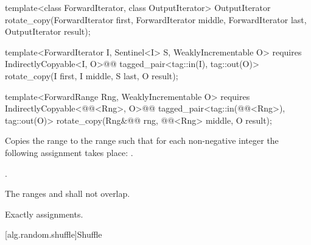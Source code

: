 %
\begin{removedblock}
\begin{itemdecl}
template<class ForwardIterator, class OutputIterator>
  OutputIterator
    rotate_copy(ForwardIterator first, ForwardIterator middle,
                ForwardIterator last, OutputIterator result);
\end{itemdecl}
\end{removedblock}
\begin{addedblock}
\begin{itemdecl}
template<ForwardIterator I, Sentinel<I> S, WeaklyIncrementable O>
  requires IndirectlyCopyable<I, O>@\newtxt{()}@
  tagged_pair<tag::in(I), tag::out(O)>
    rotate_copy(I first, I middle, S last, O result);

template<ForwardRange Rng, WeaklyIncrementable O>
  requires IndirectlyCopyable<@@<Rng>, O>@\newtxt{()}@
  tagged_pair<tag::in(@@<Rng>), tag::out(O)>
    rotate_copy(Rng&@\newtxt{\&}@ rng, @@<Rng> middle, O result);
\end{itemdecl}
\end{addedblock}

\begin{itemdescr}
\pnum
\effects
Copies the range
to the range
such that for each non-negative integer
the following assignment takes place:
.

\pnum
\returns
{}.

\pnum
\requires
The ranges
and
shall not overlap.

\pnum
\complexity
Exactly
assignments.
\end{itemdescr}

[alg.random.shuffle]{Shuffle}

